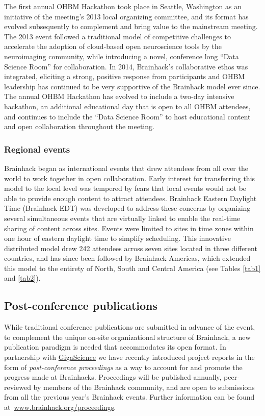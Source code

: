 \documentclass[11pt]{bmc_article_s50}
\begin{document}
The first annual OHBM Hackathon took place in Seattle, Washington as an initiative of the meeting's 2013 local organizing committee, and its format has evolved subsequently to complement and bring value to the mainstream meeting. The 2013 event followed a traditional model of competitive challenges to accelerate the adoption of cloud-based open neuroscience tools by the neuroimaging community, while introducing a novel, conference long ``Data Science Room'' for collaboration. In 2014, Brainhack's collaborative ethos was integrated, eliciting a strong, positive response from participants and OHBM leadership has continued to be very supportive of the Brainhack model ever since. The annual OHBM Hackathon has evolved to include a two-day intensive hackathon, an additional educational day that is open to all OHBM attendees, and continues to include the ``Data Science Room'' to host educational content and open collaboration throughout the meeting. 

\subsubsection{Regional events}

Brainhack began as international events that drew attendees from all over the world to work together in open collaboration. Early interest for transferring this model to the local level was tempered by fears that local events would not be able to provide enough content to attract attendees. Brainhack Eastern Daylight Time (Brainhack EDT) was developed to address these concerns by organizing several simultaneous events that are virtually linked to enable the real-time sharing of content across sites. Events were limited to sites in time zones within one hour of eastern daylight time to simplify scheduling. This innovative distributed model drew 242 attendees across seven sites located in three different countries, and has since been followed by Brainhack Americas, which extended this model to the entirety of North, South and Central America (see Tables \ref{tab1} and \ref{tab2}).

\subsection{Post-conference publications}

While traditional conference publications are submitted in advance of the event, to complement the unique on-site organizational structure of Brainhack, a new publication paradigm is needed that accommodates its open format. In partnership with \href{http://www.gigasciencejournal.com/}{GigaScience} we have recently introduced project reports in the form of \emph{post-conference proceedings} as a way to account for and promote the progress made at Brainhacks. Proceedings will be published annually, peer-reviewed by members of the Brainhack community, and are open to submissions from all the previous year's Brainhack events. Further information can be found at~\href{http://brainhack.org/proceedings}{www.brainhack.org/proceedings}. 
\end{document}
